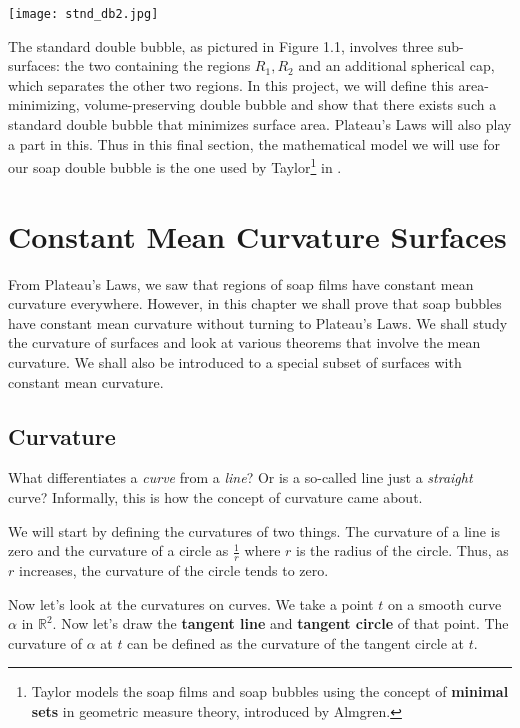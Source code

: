 \documentclass[a4paper,12pt]{report}
\begin{document}
\begin{center}
\texttt{[image: stnd\_db2.jpg]}
\end{center}

The standard double bubble, as pictured in Figure 1.1, involves three sub-surfaces: the two containing the regions $R_{1}, R_{2}$ and an additional spherical cap, which separates the other two regions. 
In this project, we will define this area-minimizing, volume-preserving double bubble and show that there exists such a standard double bubble that minimizes surface area. Plateau's Laws will also play a part in this. Thus in this final section, the mathematical model we will use for our soap double bubble is the one used by Taylor\footnote{Taylor models the soap films and soap bubbles using the concept of \textbf{minimal sets} in geometric measure theory, introduced by Almgren.} in \cite{taylor}.


\chapter{Constant Mean Curvature Surfaces}


From Plateau's Laws, we saw that regions of soap films have constant mean curvature everywhere. However, in this chapter we shall prove that soap bubbles have constant mean curvature without turning to Plateau's Laws. We shall study the curvature of surfaces and look at various theorems that involve the mean curvature. We shall also be introduced to a special subset of surfaces with constant mean curvature.

\section{Curvature}

What differentiates a \textit{curve} from a \textit{line}? Or is a so-called line just a \textit{straight} curve? Informally, this is how the concept of curvature came about.\newline

\hspace{-0.66cm}We will start by defining the curvatures of two things. The curvature of a line is zero and the curvature of a circle as $\frac{1}{r}$ where $r$ is the radius of the circle. Thus, as $r$ increases, the curvature of the circle tends to zero.\newline 

Now let's look at the curvatures on curves. We take a point $t$ on a smooth curve $\alpha$ in $\mathbb{R}^{2}$. Now let's draw the \textbf{tangent line} and \textbf{tangent circle} of that point. The curvature of $\alpha$ at $t$ can be defined as the curvature of the tangent circle at $t$.
\end{document}
